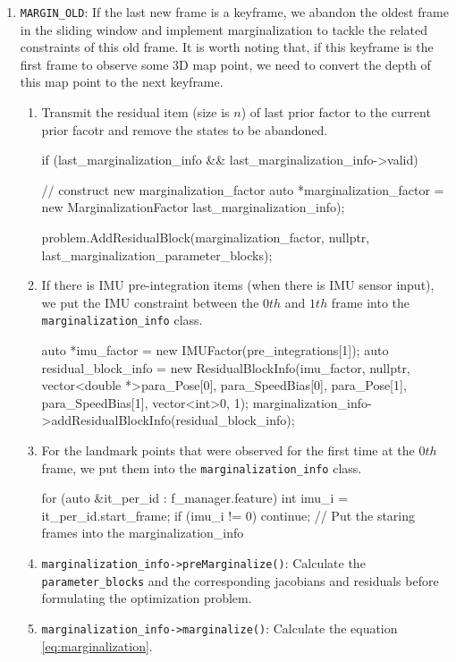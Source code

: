 \documentclass[12pt]{report}   %
\begin{document}
\begin{enumerate}
	\item \verb|MARGIN_OLD|: If the last new frame is a keyframe, we abandon the oldest frame in the sliding window and implement marginalization to tackle the related constraints of this old frame. It is worth noting that, if this keyframe is the first frame to observe some 3D map point, we need to convert the depth of this map point to the next keyframe.
	
	\begin{enumerate}
		\item Transmit the residual item (size is $n$) of last prior factor to the current prior facotr and remove the states to be abandoned.
		
		\begin{cppcode}
if (last_marginalization_info && last_marginalization_info->valid)
 {
  // construct new marginalization\_factor
  auto *marginalization_factor = new 
  MarginalizationFactor last_marginalization_info);
  
  problem.AddResidualBlock(marginalization_factor, nullptr,
  last_marginalization_parameter_blocks);
}
		\end{cppcode}
		
		\item If there is IMU pre-integration items (when there is IMU sensor input), we put the IMU constraint between the $0th$ and $1th$ frame into the \verb|marginalization_info| class.
		\begin{cppcode}
auto *imu_factor = new IMUFactor(pre_integrations[1]);
auto residual_block_info = new ResidualBlockInfo(imu_factor, 
  nullptr, vector<double *>{para_Pose[0], para_SpeedBias[0],
  para_Pose[1], para_SpeedBias[1]},
  vector<int>{0, 1});
marginalization_info->addResidualBlockInfo(residual_block_info);
		\end{cppcode}
		\item For the landmark points that were observed for the first time at the $0th$ frame, we put them into the \verb|marginalization_info| class.
		\begin{cppcode}
for (auto &it_per_id : f_manager.feature) {
  int imu_i = it_per_id.start_frame;
  if (imu_i != 0)
    continue;
  // Put the staring frames into the marginalization\_info
}
		\end{cppcode}
		\item \verb|marginalization_info->preMarginalize()|: Calculate the \verb|parameter_blocks| and the corresponding jacobians and residuals before formulating the optimization problem.
		\item \verb|marginalization_info->marginalize()|: Calculate the equation \eqref{eq:marginalization}.
		

\end{enumerate}
\end{enumerate}
\end{document}
